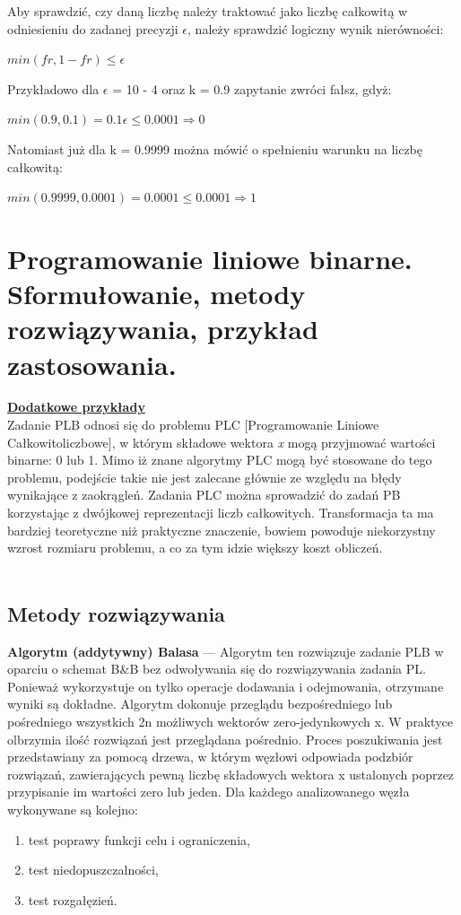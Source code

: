 \documentclass[10pt, a
4paper]{article}
\begin{document}
Aby sprawdzić, czy daną liczbę należy traktować jako liczbę całkowitą w odniesieniu do zadanej precyzji $\epsilon$, należy sprawdzić logiczny wynik nierówności:
\begin{center}
$min(fr, 1 - fr) \leq \epsilon$\\
\end{center}

Przykładowo dla $\epsilon$ = 10 - 4 oraz k = 0.9 zapytanie zwróci fałsz, gdyż:
\begin{center}
$min(0.9, 0.1) = 0.1 \epsilon \leq 0.0001 	\Rightarrow 0$
\end{center}

Natomiast już dla k = 0.9999 można mówić o spełnieniu warunku na liczbę całkowitą:
\begin{center}
$min(0.9999, 0.0001) = 0.0001 \leq 0.0001 	\Rightarrow 1$
\end{center}

\newpage
\section{Programowanie liniowe binarne. Sformułowanie, metody rozwiązywania, przykład
zastosowania.}
\textbf{\href{http://tarapata.strefa.pl/p_ekonometria/download/ekonometria\%20_cz3_1a.pdf}{Dodatkowe przykłady}} \\
Zadanie PLB odnosi się do problemu PLC [Programowanie Liniowe Całkowitoliczbowe], w którym składowe wektora
\emph{x} mogą przyjmować wartości binarne: 0 lub 1. Mimo iż znane algorytmy
PLC mogą być stosowane do tego problemu, podejście takie nie jest zalecane głównie ze względu na błędy wynikające z zaokrągleń. Zadania PLC
można sprowadzić do zadań PB korzystając z dwójkowej reprezentacji liczb całkowitych. Transformacja ta ma bardziej teoretyczne niż praktyczne znaczenie, bowiem powoduje niekorzystny wzrost rozmiaru problemu, a co za tym idzie większy koszt obliczeń.\\\\
\subsection{Metody rozwiązywania}
\textbf{Algorytm (addytywny) Balasa} --- Algorytm ten rozwiązuje zadanie PLB w oparciu o schemat B\&B bez odwoływania się do rozwiązywania zadania PL. Ponieważ wykorzystuje on tylko operacje dodawania i odejmowania, otrzymane wyniki są dokładne. Algorytm dokonuje przeglądu bezpośredniego lub pośredniego wszystkich 2n możliwych wektorów zero-jedynkowych x. W praktyce olbrzymia ilość rozwiązań jest przeglądana pośrednio. Proces poszukiwania jest przedstawiany za pomocą drzewa, w którym węzłowi odpowiada podzbiór rozwiązań, zawierających pewną liczbę składowych wektora x ustalonych poprzez przypisanie im wartości zero lub jeden. Dla każdego analizowanego węzła wykonywane są kolejno:
\begin{enumerate}
\item test poprawy funkcji celu i ograniczenia,
\item test niedopuszczalności,
\item test rozgałęzień.
\end{enumerate}
\end{document}

